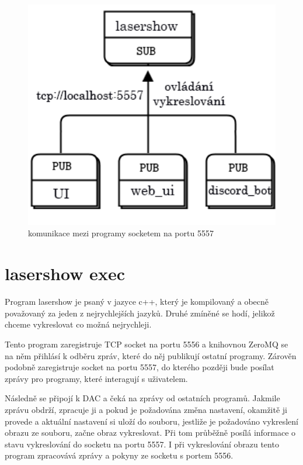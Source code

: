\documentclass{template/socthesis}
\begin{document}
\begin{figure}[!htb]
  \centering
  \includegraphics[width=1\textwidth]{img/tcp5557.png}
  \caption{\label{fig:tcp5557}komunikace mezi programy socketem na portu 5557}
\end{figure}

\section{lasershow exec}

Program lasershow je psaný v jazyce c++, který je kompilovaný a obecně považovaný za jeden z nejrychlejších jazyků. Druhé zmíněné se hodí, jelikož chceme vykreslovat co možná nejrychleji.


Tento program zaregistruje TCP socket na portu 5556 a knihovnou ZeroMQ se na něm přihlásí k odběru zpráv, které do něj publikují ostatní programy. Zárověn podobně zaregistruje socket na portu 5557, do kterého později bude posílat zprávy pro programy, které interagují s uživatelem.

Následně se připojí k DAC a čeká na zprávy od ostatních programů. Jakmile zprávu obdrží, zpracuje ji a pokud je požadována změna nastavení, okamžitě ji provede a aktuální nastavení si uloží do souboru, jestliže je požadováno vykreslení obrazu ze souboru, začne obraz vykreslovat. Při tom průběžně posílá informace o stavu vykreslování do socketu na portu 5557. I při vykreslování obrazu tento program zpracovává zprávy a pokyny ze socketu s portem 5556.
\end{document}
